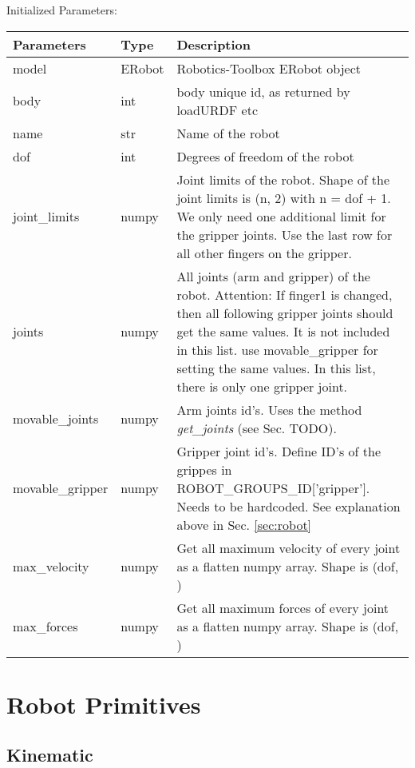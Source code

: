 \documentclass[
	ngerman,
	accentcolor=9c,%
	type=intern,
	marginpar=false
	]{tudapub}
\begin{document}
\noindent Initialized Parameters:

\vspace{0.5cm}



\begin{tabular}{|p{}| p{}| p{}|}
\hline
\textbf{Parameters} & \textbf{Type} & \textbf{Description} \\
\hline
model & ERobot & Robotics-Toolbox ERobot object \\
\hline
body & int&  body unique id, as returned by loadURDF etc\\
\hline
name & str & Name of the robot \\
\hline
dof & int & Degrees of freedom of the robot \\
\hline
joint\_limits & numpy & Joint limits of the robot. Shape of the joint limits is (n, 2) with n = dof + 1. We only need one additional limit for the gripper joints. Use the last row for all other fingers on the gripper. \\
\hline
joints & numpy & All joints (arm and gripper) of the robot. Attention: If finger1 is changed, then all following gripper joints should get the same values. It is not included in this list. use movable\_gripper for setting the same values. In this list, there is only one gripper joint. \\
\hline
movable\_joints & numpy & Arm joints id's. Uses the method \textit{get\_joints} (see Sec. TODO). \\
\hline
movable\_gripper & numpy & Gripper joint id's. Define ID's of the grippes in ROBOT\_GROUPS\_ID['gripper']. Needs to be hardcoded. See explanation above in Sec. \ref{sec:robot}\\
\hline
max\_velocity & numpy &  Get all maximum velocity of every joint  as a flatten numpy array. Shape is (dof, )\\
\hline
max\_forces & numpy&   Get all maximum forces of every joint  as a flatten numpy array. Shape is (dof, )\\
\hline
\end{tabular}

\newpage

\section{Robot Primitives}

\subsection{Kinematic}
\end{document}
